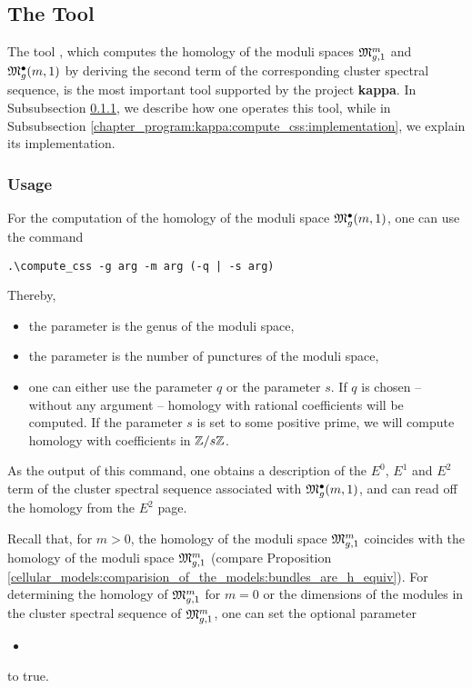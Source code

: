 \subsection{The Tool }
\label{chapter_program:kappa:compute_css}

The tool , which computes the homology of the moduli spaces $\Modspc[1]$ and $\ModspcRad[1]$
by deriving the second term of the corresponding cluster spectral sequence,
is the most important tool supported by the project {\bfseries kappa}.
In Subsubsection \ref{chapter_program:kappa:compute_css:usage}, we describe 
how one operates this tool, 
while in Subsubsection \ref{chapter_program:kappa:compute_css:implementation},
we explain its implementation. 

\subsubsection{Usage}
\label{chapter_program:kappa:compute_css:usage}

For the computation of the homology of the moduli space $\ModspcRad[1]$, 
one can use the command
\begin{lstlisting}
.\compute_css -g arg -m arg (-q | -s arg)
\end{lstlisting}
Thereby,
\begin{itemize}
\item the parameter  is the genus of the moduli space,
\item the parameter  is the number of punctures of the moduli space,
\item one can either use the parameter $q$ or the parameter $s$. 
      If $q$ is chosen -- without any argument -- homology with rational coefficients will be computed.
      If the parameter $s$ is set to some positive prime, we will compute homology with coefficients in $\Z/s\Z$.
\end{itemize}
As the output of this command, one obtains a description of the $E^0$, $E^1$ and $E^2$ term of the cluster spectral sequence associated with $\ModspcRad[1]$,
and can read off the homology from the $E^2$ page.  

Recall that, for $m > 0$, the homology of the moduli space $\Modspc[1]$ coincides with the homology of the moduli space $\Modspc[1]$ 
(compare Proposition \ref{cellular_models:comparision_of_the_models:bundles_are_h_equiv}).
For determining the homology of $\Modspc[1]$ for $m = 0$ 
or the dimensions of the modules in the cluster spectral sequence of $\Modspc[1]$, one can set the optional parameter
\begin{itemize}
 \item {}
\end{itemize}
to true.

